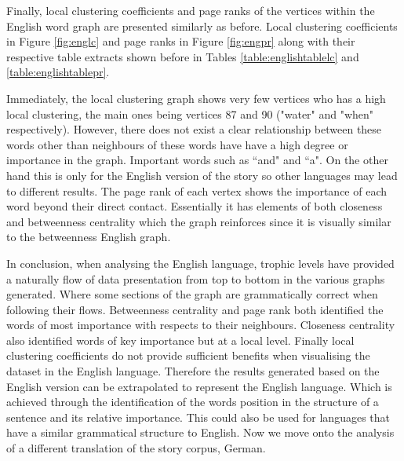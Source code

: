 Finally, local clustering coefficients and page ranks of the vertices within the English word graph are presented similarly as before.  Local clustering coefficients in Figure \ref{fig:englc} and page ranks in Figure \ref{fig:engpr} along with their respective table extracts shown before in Tables \ref{table:englishtablelc} and \ref{table:englishtablepr}. 

Immediately, the local clustering graph shows very few vertices who has a high local clustering, the main ones being vertices 87 and 90 ("water" and "when" respectively). However, there does not exist a clear relationship between these words other than neighbours of these words have have a high degree or importance in the graph. Important words such as ``and" and ``a". On the other hand this is only for the English version of the story so other languages may lead to different results. The page rank of each vertex shows the importance of each word beyond their direct contact. Essentially it has elements of both closeness and betweenness centrality which the graph reinforces since it is visually similar to the betweenness English graph.

In conclusion, when analysing the English language, trophic levels have provided a naturally flow of data presentation from top to bottom in the various graphs generated. Where some sections of the graph are grammatically correct when following their flows. Betweenness centrality and page rank both identified the words of most importance with respects to their neighbours. Closeness centrality also identified words of key importance but at a local level. Finally local clustering coefficients do not provide sufficient benefits when visualising the dataset in the English language. Therefore the results generated based on the English version can be extrapolated to represent the English language. Which is achieved through the identification of the words position in the structure of a sentence and its relative importance. This could also be used for languages that have a similar grammatical structure to English. Now we move onto the analysis of a different translation of the story corpus, German.

